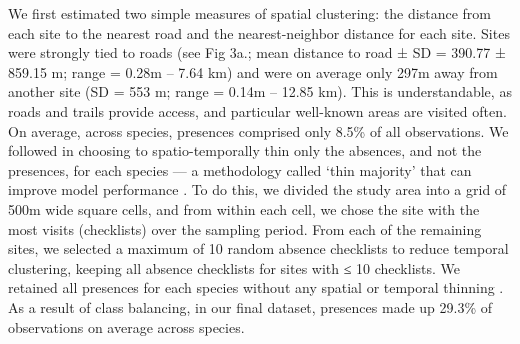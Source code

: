 We first estimated two simple measures of spatial clustering: the distance from each site to the nearest road \citep[road data from OpenStreetMap:][]{openstreetmapcontributors2017} and the nearest-neighbor distance for each site.
Sites were strongly tied to roads (see Fig 3a.; mean distance to road ± SD = 390.77 ± 859.15 m; range = 0.28m -- 7.64 km) and were on average only 297m away from another site (SD = 553 m; range = 0.14m -- 12.85 km).
This is understandable, as roads and trails provide access, and particular well-known areas are visited often.
On average, across species, presences comprised only 8.5\% of all observations.
We followed \textcite{steen2021} in choosing to spatio-temporally thin only the absences, and not the presences, for each species --- a methodology called `thin majority' that can improve model performance \citep{steen2021}.
To do this, we divided the study area into a grid of 500m wide square cells, and from within each cell, we chose the site with the most visits (checklists) over the sampling period.
From each of the remaining sites, we selected a maximum of 10 random absence checklists to reduce temporal clustering, keeping all absence checklists for sites with ≤ 10 checklists.
We retained all presences for each species without any spatial or temporal thinning \citep{steen2021}.
As a result of class balancing, in our final dataset, presences made up 29.3\% of observations on average across species.

